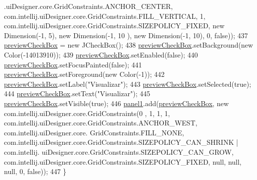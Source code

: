 \begin{DoxyCode}
      .uiDesigner.core.GridConstraints.ANCHOR\_CENTER, com.intellij.uiDesigner.core.GridConstraints.FILL\_VERTICAL, 
      1, com.intellij.uiDesigner.core.GridConstraints.SIZEPOLICY\_FIXED, \textcolor{keyword}{new} Dimension(-1, 5), \textcolor{keyword}{new} Dimension(-1, 10
      ), \textcolor{keyword}{new} Dimension(-1, 10), 0, \textcolor{keyword}{false}));
437         \hyperlink{classpresentacion_1_1form_1_1mainForm_a0dbe9873e69c0702a519d1cd171594c0}{previewCheckBox} = \textcolor{keyword}{new} JCheckBox();
438         \hyperlink{classpresentacion_1_1form_1_1mainForm_a0dbe9873e69c0702a519d1cd171594c0}{previewCheckBox}.setBackground(\textcolor{keyword}{new} Color(-14013910));
439         \hyperlink{classpresentacion_1_1form_1_1mainForm_a0dbe9873e69c0702a519d1cd171594c0}{previewCheckBox}.setEnabled(\textcolor{keyword}{false});
440         \hyperlink{classpresentacion_1_1form_1_1mainForm_a0dbe9873e69c0702a519d1cd171594c0}{previewCheckBox}.setFocusPainted(\textcolor{keyword}{false});
441         \hyperlink{classpresentacion_1_1form_1_1mainForm_a0dbe9873e69c0702a519d1cd171594c0}{previewCheckBox}.setForeground(\textcolor{keyword}{new} Color(-1));
442         \hyperlink{classpresentacion_1_1form_1_1mainForm_a0dbe9873e69c0702a519d1cd171594c0}{previewCheckBox}.setLabel(\textcolor{stringliteral}{"Visualizar"});
443         \hyperlink{classpresentacion_1_1form_1_1mainForm_a0dbe9873e69c0702a519d1cd171594c0}{previewCheckBox}.setSelected(\textcolor{keyword}{true});
444         \hyperlink{classpresentacion_1_1form_1_1mainForm_a0dbe9873e69c0702a519d1cd171594c0}{previewCheckBox}.setText(\textcolor{stringliteral}{"Visualizar"});
445         \hyperlink{classpresentacion_1_1form_1_1mainForm_a0dbe9873e69c0702a519d1cd171594c0}{previewCheckBox}.setVisible(\textcolor{keyword}{true});
446         \hyperlink{classpresentacion_1_1form_1_1mainForm_aa43e009cc6dc09d4e637385fbd361510}{panel1}.add(\hyperlink{classpresentacion_1_1form_1_1mainForm_a0dbe9873e69c0702a519d1cd171594c0}{previewCheckBox}, \textcolor{keyword}{new} com.intellij.uiDesigner.core.GridConstraints(0
      , 1, 1, 1, com.intellij.uiDesigner.core.GridConstraints.ANCHOR\_WEST, com.intellij.uiDesigner.core.
      GridConstraints.FILL\_NONE, com.intellij.uiDesigner.core.GridConstraints.SIZEPOLICY\_CAN\_SHRINK | com.intellij.
      uiDesigner.core.GridConstraints.SIZEPOLICY\_CAN\_GROW, com.intellij.uiDesigner.core.GridConstraints.SIZEPOLICY\_FIXED, 
      null, null, null, 0, \textcolor{keyword}{false}));
447     \}
\end{DoxyCode}
\mbox{\label{classpresentacion_1_1form_1_1mainForm_a5db496bbae052ad3d04d03e194db82e4}} 
